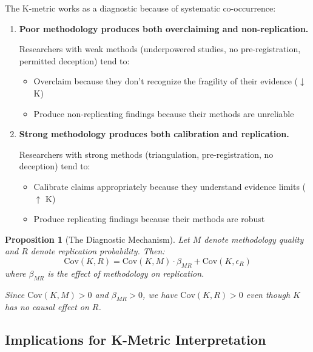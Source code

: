 \documentclass[11pt,a4paper]{article}
\newtheorem{proposition}[theorem]{Proposition}
\theoremstyle{remark}
\begin{document}
The K-metric works as a diagnostic because of systematic co-occurrence:

\begin{enumerate}
    \item \textbf{Poor methodology produces both overclaiming and non-replication.}

    Researchers with weak methods (underpowered studies, no pre-registration, permitted deception) tend to:
    \begin{itemize}
        \item Overclaim because they don't recognize the fragility of their evidence ($\downarrow$ K)
        \item Produce non-replicating findings because their methods are unreliable
    \end{itemize}

    \item \textbf{Strong methodology produces both calibration and replication.}

    Researchers with strong methods (triangulation, pre-registration, no deception) tend to:
    \begin{itemize}
        \item Calibrate claims appropriately because they understand evidence limits ($\uparrow$ K)
        \item Produce replicating findings because their methods are robust
    \end{itemize}
\end{enumerate}

\begin{proposition}[The Diagnostic Mechanism]
\label{prop:diagnostic-mechanism}
Let $M$ denote methodology quality and $R$ denote replication probability. Then:
\begin{equation}
\text{Cov}(K, R) = \text{Cov}(K, M) \cdot \beta_{MR} + \text{Cov}(K, \epsilon_R)
\end{equation}
where $\beta_{MR}$ is the effect of methodology on replication.

Since $\text{Cov}(K, M) > 0$ and $\beta_{MR} > 0$, we have $\text{Cov}(K, R) > 0$ even though $K$ has no causal effect on $R$.
\end{proposition}

\subsection{Implications for K-Metric Interpretation}
\end{document}
